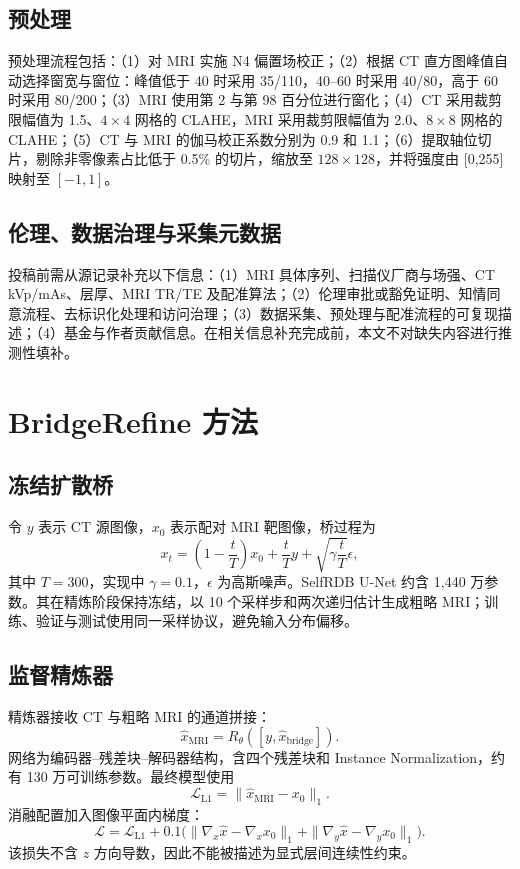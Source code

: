 \documentclass[UTF8,12pt,a4paper,twocolumn]{ctexart}
\begin{document}
\subsection{预处理}
预处理流程包括：（1）对 MRI 实施 N4 偏置场校正；（2）根据 CT 直方图峰值自动选择窗宽与窗位：峰值低于 40 时采用 35/110，40--60 时采用 40/80，高于 60 时采用 80/200；（3）MRI 使用第 2 与第 98 百分位进行窗化；（4）CT 采用裁剪限幅值为 1.5、$4\times4$ 网格的 CLAHE，MRI 采用裁剪限幅值为 2.0、$8\times8$ 网格的 CLAHE；（5）CT 与 MRI 的伽马校正系数分别为 0.9 和 1.1；（6）提取轴位切片，剔除非零像素占比低于 0.5\% 的切片，缩放至 $128\times128$，并将强度由 [0,255] 映射至 $[-1,1]$。

\subsection{伦理、数据治理与采集元数据}
投稿前需从源记录补充以下信息：（1）MRI 具体序列、扫描仪厂商与场强、CT kVp/mAs、层厚、MRI TR/TE 及配准算法；（2）伦理审批或豁免证明、知情同意流程、去标识化处理和访问治理；（3）数据采集、预处理与配准流程的可复现描述；（4）基金与作者贡献信息。在相关信息补充完成前，本文不对缺失内容进行推测性填补。

\section{BridgeRefine 方法}
\subsection{冻结扩散桥}
令 $y$ 表示 CT 源图像，$x_0$ 表示配对 MRI 靶图像，桥过程为
\begin{equation}
x_t=\left(1-\frac{t}{T}\right)x_0+\frac{t}{T}y+\sqrt{\gamma\frac{t}{T}}\epsilon,
\end{equation}
其中 $T=300$，实现中 $\gamma=0.1$，$\epsilon$ 为高斯噪声。SelfRDB U-Net 约含 1,440 万参数。其在精炼阶段保持冻结，以 10 个采样步和两次递归估计生成粗略 MRI；训练、验证与测试使用同一采样协议，避免输入分布偏移。

\subsection{监督精炼器}
精炼器接收 CT 与粗略 MRI 的通道拼接：
\begin{equation}
\hat{x}_{\mathrm{MRI}}=R_\theta([y,\hat{x}_{\mathrm{bridge}}]).
\end{equation}
网络为编码器--残差块--解码器结构，含四个残差块和 Instance Normalization，约有 130 万可训练参数。最终模型使用
\begin{equation}\mathcal L_{\mathrm{L1}}=\|\hat{x}_{\mathrm{MRI}}-x_0\|_1.\end{equation}
消融配置加入图像平面内梯度：
\begin{equation}
\mathcal L=\mathcal L_{\mathrm{L1}}+0.1\bigl(\|\nabla_x\hat{x}-\nabla_xx_0\|_1+\|\nabla_y\hat{x}-\nabla_yx_0\|_1\bigr).
\end{equation}
该损失不含 $z$ 方向导数，因此不能被描述为显式层间连续性约束。
\end{document}
